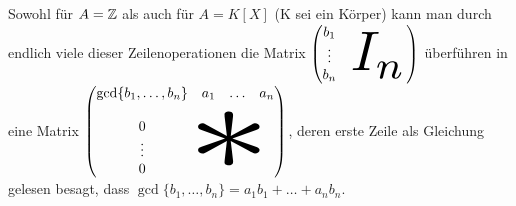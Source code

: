 \documentclass[../../main.tex]{subfiles}
\begin{document}
\noindent Sowohl für $A=\mathbb Z$ als auch für $A=K[X]$ (K sei ein Körper) kann man durch endlich viele dieser Zeilenoperationen die Matrix $\begin{pmatrix}b_1&&&&&\\\vdots&&&&\\
b_n&&&&&\begin{tikzpicture}[overlay]\node[xshift=-0.7cm,yshift=0.6cm,scale=4]{$I_n$};\end{tikzpicture}
\end{pmatrix}$ überführen in eine Matrix $\begin{pmatrix}\gcd\{b_1,\ldots ,b_n\}& a_1 & \hdots & a_n\\
\\0&&&\\\vdots&&&\begin{tikzpicture}[overlay]\node[xshift=-0.9cm,yshift=0.4cm,xscale=12,yscale=9]{$*$};\end{tikzpicture}\
\\0&&&
\end{pmatrix}$, deren erste Zeile als Gleichung gelesen besagt, dass $\gcd\{b_1,\ldots ,b_n\}=a_1b_1+\ldots +a_nb_n$.
\end{document}

